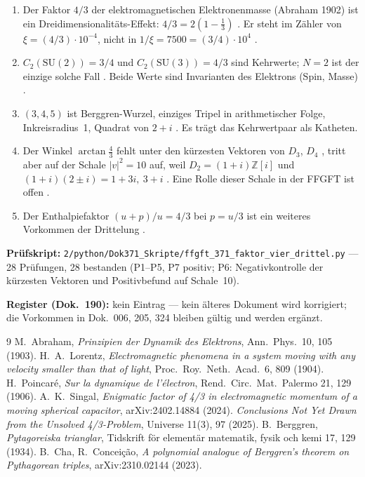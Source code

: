 \begin{enumerate}
\item Der Faktor $4/3$ der elektromagnetischen Elektronenmasse (Abraham 1902)
  ist ein Dreidimensionalitäts-Effekt: $4/3 = 2(1-\tfrac13)$ \EM\BM. Er steht
  im Zähler von $\xi = (4/3)\cdot10^{-4}$, nicht in $1/\xi=7500=(3/4)\cdot10^4$ \SM.
\item $C_2(\mathrm{SU}(2)) = 3/4$ und $C_2(\mathrm{SU}(3)) = 4/3$ sind
  Kehrwerte; $N=2$ ist der einzige solche Fall \BM. Beide Werte sind
  Invarianten des Elektrons (Spin, Masse) \SM.
\item $(3,4,5)$ ist Berggren-Wurzel, einziges Tripel in arithmetischer Folge,
  Inkreisradius~1, Quadrat von $2+i$ \BM. Es trägt das Kehrwertpaar als
  Katheten.
\item Der Winkel $\arctan\tfrac43$ fehlt unter den kürzesten Vektoren von
  $D_3$, $D_4$ \XM, tritt aber auf der Schale $|v|^2=10$ auf, weil
  $D_2 = (1+i)\mathbb Z[i]$ und $(1+i)(2\pm i) = 1+3i,\ 3+i$ \BM. Eine Rolle
  dieser Schale in der FFGFT ist offen \SM.
\item Der Enthalpiefaktor $(u+p)/u = 4/3$ bei $p = u/3$ ist ein weiteres
  Vorkommen der Drittelung \EM.
\end{enumerate}

\medskip
\noindent\textbf{Prüfskript:} \texttt{2/python/Dok371\_Skripte/ffgft\_371\_faktor\_vier\_drittel.py}
--- 28 Prüfungen, 28 bestanden (P1--P5, P7 positiv; P6: Negativkontrolle der kürzesten Vektoren und Positivbefund auf Schale~10).

\medskip
\noindent\textbf{Register (Dok.~190):} kein Eintrag --- kein älteres Dokument
wird korrigiert; die Vorkommen in Dok.~006, 205, 324 bleiben gültig und werden
ergänzt.

\begin{thebibliography}{9}
 M.~Abraham, \emph{Prinzipien der Dynamik des Elektrons},
  Ann.\ Phys.\ 10, 105 (1903).
 H.~A.~Lorentz, \emph{Electromagnetic phenomena in a system
  moving with any velocity smaller than that of light}, Proc.\ Roy.\ Neth.\
  Acad.\ 6, 809 (1904).
 H.~Poincaré, \emph{Sur la dynamique de l'électron},
  Rend.\ Circ.\ Mat.\ Palermo 21, 129 (1906).
 A.~K.~Singal, \emph{Enigmatic factor of 4/3 in electromagnetic
  momentum of a moving spherical capacitor}, arXiv:2402.14884 (2024).
\bibitem{universe} \emph{Conclusions Not Yet Drawn from the Unsolved
  4/3-Problem}, Universe 11(3), 97 (2025).
 B.~Berggren, \emph{Pytagoreiska trianglar}, Tidskrift för
  elementär matematik, fysik och kemi 17, 129 (1934).
 B.~Cha, R.~Conceição, \emph{A polynomial analogue of Berggren's
  theorem on Pythagorean triples}, arXiv:2310.02144 (2023).
\end{thebibliography}
